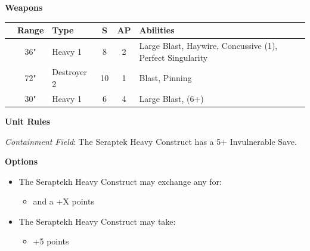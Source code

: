 \begin{minipage}[t]{0.72\textwidth}
	\vspace*{2em}
	\textbf{Weapons}
	
	\begin{tabular}{L{90 pt} c C{40pt} *{2}{c} >{\raggedright\arraybackslash}p{130pt}}
		& Range & Type & S & AP & Abilities \\
		\hline
		 & 36" & Heavy 1 & 8 & 2 & Large Blast, Haywire, Concussive (1), Perfect Singularity  \\
		 & 72" & Destroyer 2 & 10 & 1 & Blast, Pinning \\
		 & 30" & Heavy 1 & 6 & 4 & Large Blast,  (6+) \\
	\end{tabular}
	
	\vspace*{2em}
	\textbf{Unit Rules}
	
	\textit{Containment Field}: The Seraptek Heavy Construct has a 5+ Invulnerable Save. 
	
	\vspace*{2em}
	\textbf{Options}
	\begin{itemize}
		\item The Seraptekh Heavy Construct may exchange any  for:
		\begin{itemize}
			\item {} and a  \dotfill +X points
		\end{itemize}
		\item The Seraptekh Heavy Construct may take:
		\begin{itemize}
			\item {} \dotfill +5 points
		\end{itemize} 
	\end{itemize}
\end{minipage}



\newpage
